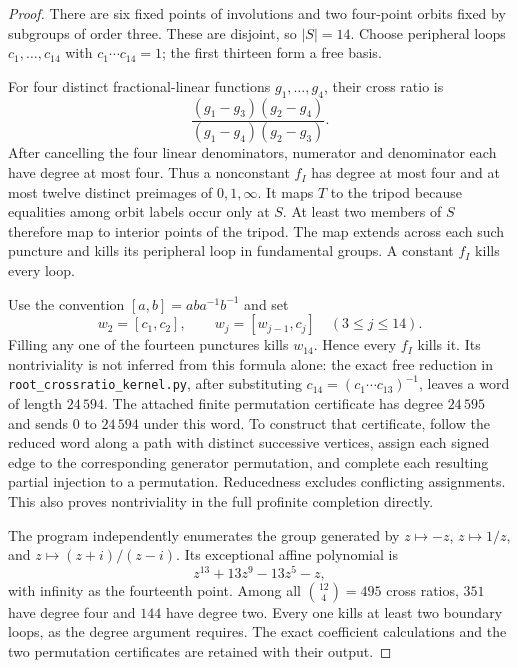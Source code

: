 \begin{proof}
There are six fixed points of involutions and two four-point orbits
fixed by subgroups of order three. These are disjoint, so $|S|=14$.
Choose peripheral loops $c_1,\ldots,c_{14}$ with
$c_1\cdots c_{14}=1$; the first thirteen form a free basis.

For four distinct fractional-linear functions $g_1,\ldots,g_4$, their
cross ratio is
\[
 \frac{(g_1-g_3)(g_2-g_4)}{(g_1-g_4)(g_2-g_3)}.
\]
After cancelling the four linear denominators, numerator and denominator
each have degree at most four. Thus a nonconstant $f_I$ has degree at
most four and at most twelve distinct preimages of $0,1,\infty$.
It maps $T$ to the tripod because equalities among orbit labels occur
only at $S$. At least two members of $S$ therefore map to interior
points of the tripod. The map extends across each such puncture and
kills its peripheral loop in fundamental groups. A constant $f_I$
kills every loop.

Use the convention $[a,b]=aba^{-1}b^{-1}$ and set
\[
 w_2=[c_1,c_2],\qquad w_j=[w_{j-1},c_j]
 \quad(3\le j\le14).
 \tag{C23.2}
\]
Filling any one of the fourteen punctures kills $w_{14}$. Hence every
$f_I$ kills it. Its nontriviality is not inferred from this formula
alone: the exact free reduction in
\texttt{root\_crossratio\_kernel.py}, after substituting
$c_{14}=(c_1\cdots c_{13})^{-1}$, leaves a word of length $24\,594$.
The attached finite permutation certificate has degree $24\,595$ and
sends $0$ to $24\,594$ under this word. To construct that certificate,
follow the reduced word along a path with distinct successive vertices,
assign each signed edge to the corresponding generator permutation,
and complete each resulting partial injection to a permutation.
Reducedness excludes conflicting assignments. This also proves
nontriviality in the full profinite completion directly.

The program independently enumerates the group generated by
$z\mapsto-z$, $z\mapsto1/z$, and $z\mapsto(z+i)/(z-i)$.
Its exceptional affine polynomial is
\[
 z^{13}+13z^9-13z^5-z,
\]
with infinity as the fourteenth point. Among all $\binom{12}{4}=495$
cross ratios, $351$ have degree four and $144$ have degree two.
Every one kills at least two boundary loops, as the degree argument
requires. The exact coefficient calculations and the two permutation
certificates are retained with their output.
\end{proof}

